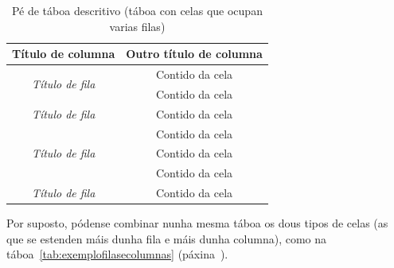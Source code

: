 \begin{table}[hp!]
  \centering
  \begin{tabular}{c|c}
  \rowcolor{udcpink!25}
  \textbf{Título de columna} & \textbf{Outro título de columna} \\\hline
  \multirow{2}{*}{\textit{Título de fila}} & \cellcolor{udcgray!25} Contido da cela \\
                                           & Contido da cela \\
  \rowcolor{udcgray!25}
  \textit{Título de fila}                  & Contido da cela \\
  \multirow{3}{*}{\textit{Título de fila}} & Contido da cela \\
                                           & \cellcolor{udcgray!25} Contido da cela \\
                                           & Contido da cela \\
  \rowcolor{udcgray!25}
  \textit{Título de fila}                  & Contido da cela \\
  \end{tabular}
  \caption{Pé de táboa descritivo (táboa con celas que ocupan varias filas)}
  \label{tab:exemplofilas}
\end{table}

Por suposto, pódense combinar nunha mesma táboa os dous tipos de celas (as que se
estenden máis dunha fila e máis dunha columna), como na táboa~\ref{tab:exemplofilasecolumnas}
(páxina~\pageref{tab:exemplofilasecolumnas}).

